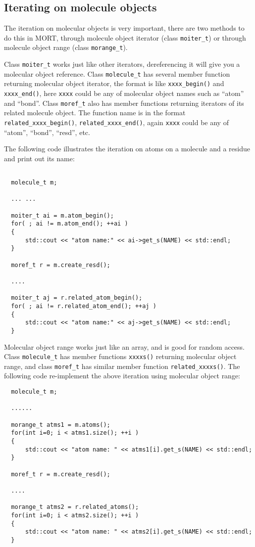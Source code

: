 \documentclass[letterpaper]{book}
\begin{document}
\subsection{Iterating on molecule objects}

  The iteration on molecular objects is very important, there are two methods to do this in
MORT, through molecule object iterator (class \lstinline$moiter_t$) or through molecule object
range (class \lstinline$morange_t$). 

  Class \lstinline$moiter_t$ works just like other iterators, dereferencing it will give you 
a molecular object reference. Class \lstinline$molecule_t$ has several member function returning
molecular object iterator, the format is like \lstinline$xxxx_begin()$ and \lstinline$xxxx_end()$,
here \lstinline$xxxx$ could be any of molecular object names such as ``atom'' and ``bond''. Class
\lstinline$moref_t$ also has member functions returning iterators of its related molecule object.
The function name is in the format \lstinline$related_xxxx_begin()$, \lstinline$related_xxxx_end()$,
again \lstinline$xxxx$ could be any of ``atom'', ``bond'', ``resd'', etc.

  The following code illustrates the iteration on atoms on a molecule and a residue and print 
out its name:

\begin{lstlisting}

  molecule_t m;

  ... ...

  moiter_t ai = m.atom_begin();
  for( ; ai != m.atom_end(); ++ai )
  {
      std::cout << "atom name:" << ai->get_s(NAME) << std::endl;
  }

  moref_t r = m.create_resd();
  
  ....

  moiter_t aj = r.related_atom_begin();
  for( ; ai != r.related_atom_end(); ++aj )
  {
      std::cout << "atom name:" << aj->get_s(NAME) << std::endl;
  }

\end{lstlisting}

  Molecular object range works just like an array, and is good for random access.
Class \lstinline$molecule_t$ has member functions \lstinline$xxxxs()$ returning
molecular object range, and class \lstinline$moref_t$ has similar member function 
\lstinline$related_xxxxs()$. The following code re-implement the above iteration
using molecular object range:

\begin{lstlisting}
  molecule_t m;
  
  ......

  morange_t atms1 = m.atoms();
  for(int i=0; i < atms1.size(); ++i )
  {
      std::cout << "atom name: " << atms1[i].get_s(NAME) << std::endl;
  }

  moref_t r = m.create_resd();

  .... 

  morange_t atms2 = r.related_atoms();
  for(int i=0; i < atms2.size(); ++i )
  {
      std::cout << "atom name: " << atms2[i].get_s(NAME) << std::endl;
  }

\end{lstlisting}
\end{document}
